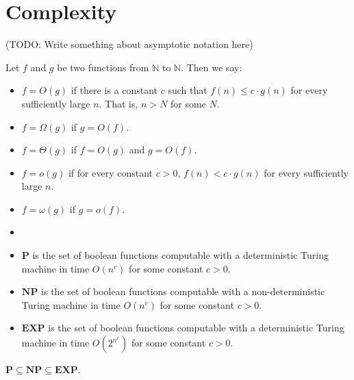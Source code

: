 

    \section{Complexity}
        (TODO: Write something about asymptotic notation here)
        
        \begin{defn} \label{def_bigo}
            Let $f$ and $g$ be two functions from $\mathbb{N}$ to $\mathbb{N}$. Then we say: \begin{itemize}
                \item $f=O(g)$ if there is a constant $c$ such that $f(n) \leq c \cdot g(n)$ for every sufficiently large $n$. That is, $n>N$ for some $N$.
                \item $f=\Omega(g)$ if $g=O(f)$.
                \item $f=\Theta(g)$ if $f=O(g)$ and $g=O(f)$.
                \item $f=o(g)$ if for every constant $c>0$, $f(n) < c \cdot g(n)$ for every sufficiently large $n$.
                \item $f=\omega(g)$ if $g=o(f)$.
            \end{itemize} 
        \end{defn}
        
        \begin{defn}[P, NP, EXP] \label{def_comp_p}
            \begin{itemize}
                \item []
                \item $\mathbf{P}$ is the set of boolean functions computable with a deterministic Turing machine in time $O(n^c)$ for some constant $c>0$.
                \item $\mathbf{NP}$ is the set of boolean functions computable with a non-deterministic Turing machine in time $O(n^c)$ for some constant $c>0$.
                \item $\mathbf{EXP}$ is the set of boolean functions computable with a deterministic Turing machine in time $O(2^{n^c})$ for some constant $c>0$.
            \end{itemize}
        \end{defn}
        
        \begin{thm} \label{thm_pnpexp}
            $\mathbf{P} \subseteq \mathbf{NP} \subseteq \mathbf{EXP}$.
        \end{thm}
        
